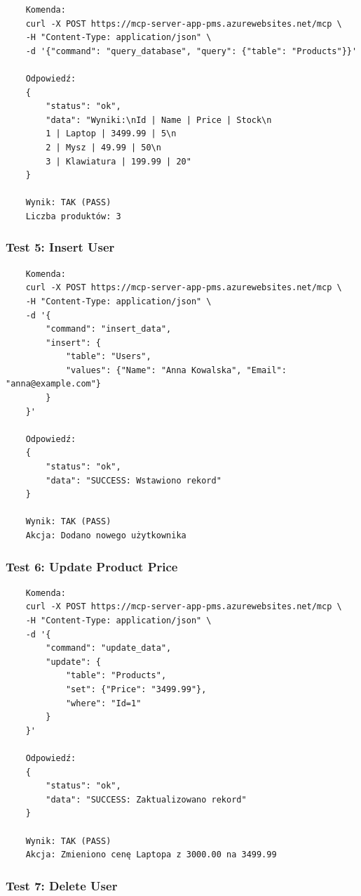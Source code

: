 \documentclass[twoside]{article}
\begin{document}
\begin{verbatim}
	Komenda:
	curl -X POST https://mcp-server-app-pms.azurewebsites.net/mcp \
	-H "Content-Type: application/json" \
	-d '{"command": "query_database", "query": {"table": "Products"}}'
	
	Odpowiedź:
	{
		"status": "ok",
		"data": "Wyniki:\nId | Name | Price | Stock\n
		1 | Laptop | 3499.99 | 5\n
		2 | Mysz | 49.99 | 50\n
		3 | Klawiatura | 199.99 | 20"
	}
	
	Wynik: TAK (PASS)
	Liczba produktów: 3
\end{verbatim}

\subsubsection{Test 5: Insert User}

\begin{verbatim}
	Komenda:
	curl -X POST https://mcp-server-app-pms.azurewebsites.net/mcp \
	-H "Content-Type: application/json" \
	-d '{
		"command": "insert_data",
		"insert": {
			"table": "Users",
			"values": {"Name": "Anna Kowalska", "Email": "anna@example.com"}
		}
	}'
	
	Odpowiedź:
	{
		"status": "ok",
		"data": "SUCCESS: Wstawiono rekord"
	}
	
	Wynik: TAK (PASS)
	Akcja: Dodano nowego użytkownika
\end{verbatim}

\subsubsection{Test 6: Update Product Price}

\begin{verbatim}
	Komenda:
	curl -X POST https://mcp-server-app-pms.azurewebsites.net/mcp \
	-H "Content-Type: application/json" \
	-d '{
		"command": "update_data",
		"update": {
			"table": "Products",
			"set": {"Price": "3499.99"},
			"where": "Id=1"
		}
	}'
	
	Odpowiedź:
	{
		"status": "ok",
		"data": "SUCCESS: Zaktualizowano rekord"
	}
	
	Wynik: TAK (PASS)
	Akcja: Zmieniono cenę Laptopa z 3000.00 na 3499.99
\end{verbatim}

\subsubsection{Test 7: Delete User}
\end{document}
